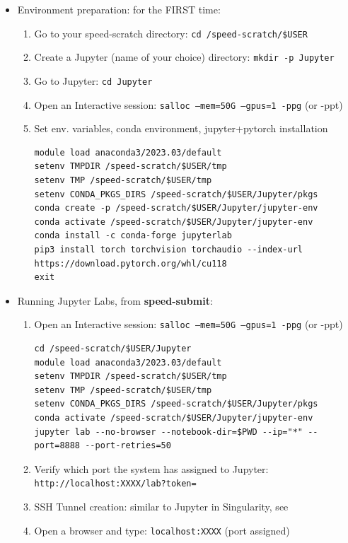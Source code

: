 \begin{itemize}
\item
Environment preparation: for the FIRST time:
\begin{enumerate}
\item
Go to your speed-scratch directory: \texttt{cd /speed-scratch/\$USER}
\item
Create a Jupyter (name of your choice) directory: \texttt{mkdir -p Jupyter}
\item
Go to Jupyter: \texttt{cd Jupyter}
\item
Open an Interactive session: \texttt{salloc --mem=50G --gpus=1 -ppg} (or -ppt)
\item
Set env. variables, conda environment, jupyter+pytorch installation
\scriptsize
\begin{verbatim}
module load anaconda3/2023.03/default
setenv TMPDIR /speed-scratch/$USER/tmp
setenv TMP /speed-scratch/$USER/tmp
setenv CONDA_PKGS_DIRS /speed-scratch/$USER/Jupyter/pkgs 
conda create -p /speed-scratch/$USER/Jupyter/jupyter-env 
conda activate /speed-scratch/$USER/Jupyter/jupyter-env
conda install -c conda-forge jupyterlab
pip3 install torch torchvision torchaudio --index-url https://download.pytorch.org/whl/cu118
exit
\end{verbatim}
\normalsize
\end{enumerate}
\item
Running Jupyter Labs, from \textbf{speed-submit}:
\begin{enumerate}
\item
Open an Interactive session: \texttt{salloc --mem=50G --gpus=1 -ppg} (or -ppt)
\scriptsize
\begin{verbatim}
cd /speed-scratch/$USER/Jupyter
module load anaconda3/2023.03/default
setenv TMPDIR /speed-scratch/$USER/tmp
setenv TMP /speed-scratch/$USER/tmp
setenv CONDA_PKGS_DIRS /speed-scratch/$USER/Jupyter/pkgs
conda activate /speed-scratch/$USER/Jupyter/jupyter-env
jupyter lab --no-browser --notebook-dir=$PWD --ip="*" --port=8888 --port-retries=50
\end{verbatim}
\normalsize
\item
Verify which port the system has assigned to Jupyter: 
\texttt{http://localhost:XXXX/lab?token=}
\item
SSH Tunnel creation: similar to Jupyter in Singularity, see 
\item
Open a browser and type: \texttt {localhost:XXXX} (port assigned)
\end{enumerate}
\end{itemize}

